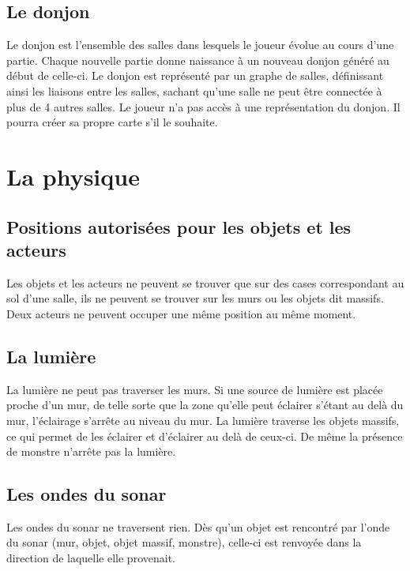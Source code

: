 \documentclass[a4paper, 11pt]{report}
\begin{document}
        \subsection{Le donjon}
          Le donjon est l'ensemble des salles dans lesquels le joueur évolue au cours d'une partie. Chaque
          nouvelle partie donne naissance à un nouveau donjon généré au début de celle-ci. 
          Le donjon est représenté par un graphe de
          salles, définissant ainsi les liaisons entre les salles, sachant qu'une salle ne peut   \^etre connectée
          à plus de 4 autres salles. Le joueur n'a pas accès à une représentation du donjon. Il pourra créer sa
          propre carte s'il le souhaite.

      \section{La physique}
        
        \subsection{Positions autorisées pour les objets et les acteurs}
          Les objets et les acteurs ne peuvent se trouver que sur des cases correspondant au sol d'une salle, 
          ils ne peuvent se trouver sur les murs ou les objets dit massifs. Deux acteurs ne peuvent occuper
          une m\^eme position au m\^eme moment.
        
        \subsection{La lumière}
          La lumière ne peut pas traverser les murs. Si une source de lumière est placée proche d'un mur, de
          telle sorte que la zone qu'elle peut éclairer s'étant au delà du mur, l'éclairage s'arrête au niveau
          du mur. La lumière traverse les objets massifs, ce qui permet de les éclairer et d'éclairer au delà de
          ceux-ci. De même la présence de monstre n'arrête pas la lumière.
          
        \subsection{Les ondes du sonar}
          Les ondes du sonar ne traversent rien. Dès qu'un objet est rencontré par l'onde du sonar (mur, objet,
          objet massif, monstre), celle-ci est renvoyée dans la direction de laquelle elle provenait.
          
\end{document}
